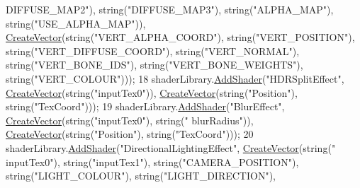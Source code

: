 \begin{DoxyCode}
{      DIFFUSE\_MAP2"}), \textcolor{keywordtype}{string}(\textcolor{stringliteral}{"DIFFUSE\_MAP3"}), \textcolor{keywordtype}{string}(\textcolor{stringliteral}{"ALPHA\_MAP"}), \textcolor{keywordtype}{string}(\textcolor{stringliteral}{"USE\_ALPHA\_MAP"})), 
      \hyperlink{_utility_8h_a436e7214fa09365bcae7bc4386dab85b}{CreateVector}(\textcolor{keywordtype}{string}(\textcolor{stringliteral}{"VERT\_ALPHA\_COORD"}), \textcolor{keywordtype}{string}(\textcolor{stringliteral}{"VERT\_POSITION"}), \textcolor{keywordtype}{string}(\textcolor{stringliteral}{"VERT\_DIFFUSE\_COORD"}),
       \textcolor{keywordtype}{string}(\textcolor{stringliteral}{"VERT\_NORMAL"}), \textcolor{keywordtype}{string}(\textcolor{stringliteral}{"VERT\_BONE\_IDS"}), \textcolor{keywordtype}{string}(\textcolor{stringliteral}{"VERT\_BONE\_WEIGHTS"}), \textcolor{keywordtype}{string}(\textcolor{stringliteral}{"VERT\_COLOUR"})));
18     shaderLibrary.\hyperlink{struct_shader_library_a5fac5a46dda49ceb6d1d361fd68b62a2}{AddShader}(\textcolor{stringliteral}{"HDRSplitEffect"}, \hyperlink{_utility_8h_a436e7214fa09365bcae7bc4386dab85b}{CreateVector}(\textcolor{keywordtype}{string}(\textcolor{stringliteral}{"inputTex0"})), 
      \hyperlink{_utility_8h_a436e7214fa09365bcae7bc4386dab85b}{CreateVector}(\textcolor{keywordtype}{string}(\textcolor{stringliteral}{"Position"}), \textcolor{keywordtype}{string}(\textcolor{stringliteral}{"TexCoord"})));
19     shaderLibrary.\hyperlink{struct_shader_library_a5fac5a46dda49ceb6d1d361fd68b62a2}{AddShader}(\textcolor{stringliteral}{"BlurEffect"}, \hyperlink{_utility_8h_a436e7214fa09365bcae7bc4386dab85b}{CreateVector}(\textcolor{keywordtype}{string}(\textcolor{stringliteral}{"inputTex0"}), \textcolor{keywordtype}{string}(\textcolor{stringliteral}{"
      blurRadius"})), \hyperlink{_utility_8h_a436e7214fa09365bcae7bc4386dab85b}{CreateVector}(\textcolor{keywordtype}{string}(\textcolor{stringliteral}{"Position"}), \textcolor{keywordtype}{string}(\textcolor{stringliteral}{"TexCoord"})));
20     shaderLibrary.\hyperlink{struct_shader_library_a5fac5a46dda49ceb6d1d361fd68b62a2}{AddShader}(\textcolor{stringliteral}{"DirectionalLightingEffect"}, \hyperlink{_utility_8h_a436e7214fa09365bcae7bc4386dab85b}{CreateVector}(\textcolor{keywordtype}{string}(\textcolor{stringliteral}{"
      inputTex0"}), \textcolor{keywordtype}{string}(\textcolor{stringliteral}{"inputTex1"}), \textcolor{keywordtype}{string}(\textcolor{stringliteral}{"CAMERA\_POSITION"}), \textcolor{keywordtype}{string}(\textcolor{stringliteral}{"LIGHT\_COLOUR"}), \textcolor{keywordtype}{string}(\textcolor{stringliteral}{"LIGHT\_DIRECTION"}), \textcolor{keywordtype}{
}
\end{DoxyCode}
